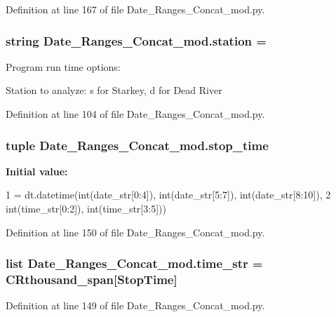 Definition at line 167 of file Date\+\_\+\+Ranges\+\_\+\+Concat\+\_\+mod.\+py.

\hypertarget{namespace_date___ranges___concat__mod_a042a8bd1d8e0f1a68b7ccb4c9d3b6f09}{}
\subsubsection[{station}]{\setlength{\rightskip}{0pt plus 5cm}string Date\+\_\+\+Ranges\+\_\+\+Concat\+\_\+mod.\+station = \textquotesingle{}}\label{namespace_date___ranges___concat__mod_a042a8bd1d8e0f1a68b7ccb4c9d3b6f09}


Program run time options\+: 

Station to analyze\+: \textquotesingle{}s\textquotesingle{} for Starkey, \textquotesingle{}d\textquotesingle{} for Dead River 

Definition at line 104 of file Date\+\_\+\+Ranges\+\_\+\+Concat\+\_\+mod.\+py.

\hypertarget{namespace_date___ranges___concat__mod_a40103ea9df455cc76da5d14434fc98d6}{}
\subsubsection[{stop\+\_\+time}]{\setlength{\rightskip}{0pt plus 5cm}tuple Date\+\_\+\+Ranges\+\_\+\+Concat\+\_\+mod.\+stop\+\_\+time}\label{namespace_date___ranges___concat__mod_a40103ea9df455cc76da5d14434fc98d6}
{\bfseries Initial value\+:}
\begin{DoxyCode}
1 = dt.datetime(int(date\_str[0:4]), int(date\_str[5:7]), int(date\_str[8:10]),
2                                     int(time\_str[0:2]), int(time\_str[3:5]))
\end{DoxyCode}


Definition at line 150 of file Date\+\_\+\+Ranges\+\_\+\+Concat\+\_\+mod.\+py.

\hypertarget{namespace_date___ranges___concat__mod_a93f60dd68eac5db76147864422f08aaa}{}
\subsubsection[{time\+\_\+str}]{\setlength{\rightskip}{0pt plus 5cm}list Date\+\_\+\+Ranges\+\_\+\+Concat\+\_\+mod.\+time\+\_\+str = {\bf C\+Rthousand\+\_\+span}\mbox{[}\textquotesingle{}Stop\+Time\textquotesingle{}\mbox{]}}\label{namespace_date___ranges___concat__mod_a93f60dd68eac5db76147864422f08aaa}


Definition at line 149 of file Date\+\_\+\+Ranges\+\_\+\+Concat\+\_\+mod.\+py.

